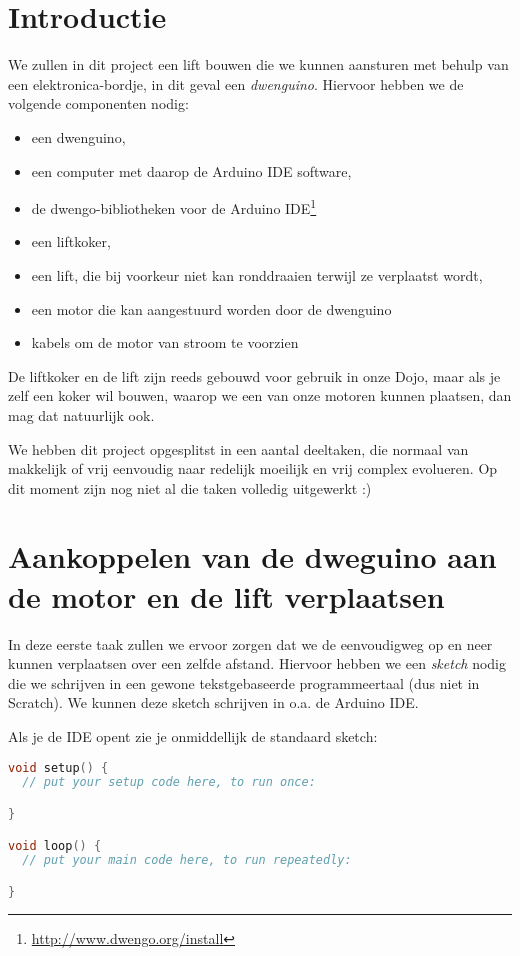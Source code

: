 \documentclass{article}
\begin{document}
\section{Introductie}

We zullen in dit project een lift bouwen die we kunnen aansturen met behulp van een elektronica-bordje, in dit
geval een {\em dwenguino}. Hiervoor hebben we de volgende componenten nodig:

\begin{itemize}
\item een dwenguino,
\item een computer met daarop de Arduino IDE software,
\item de dwengo-bibliotheken voor de Arduino IDE\footnote{\url{http://www.dwengo.org/install}}
\item een liftkoker,
\item een lift, die bij voorkeur niet kan ronddraaien terwijl ze verplaatst wordt,
\item een motor die kan aangestuurd worden door de dwenguino
\item kabels om de motor van stroom te voorzien
\end{itemize}

De liftkoker en de lift zijn reeds gebouwd voor gebruik in onze Dojo, maar als je zelf een koker wil bouwen, waarop
we een van onze motoren kunnen plaatsen, dan mag dat natuurlijk ook.

We hebben dit project opgesplitst in een aantal deeltaken, die normaal van makkelijk of vrij eenvoudig naar redelijk
moeilijk en vrij complex evolueren. Op dit moment zijn nog niet al die taken volledig uitgewerkt :)


\section{Aankoppelen van de dweguino aan de motor en de lift verplaatsen}

In deze eerste taak zullen we ervoor zorgen dat we de eenvoudigweg op en neer kunnen verplaatsen over een zelfde
afstand. Hiervoor hebben we een {\em sketch} nodig die we schrijven in een gewone tekstgebaseerde programmeertaal (dus
niet in Scratch). We kunnen deze sketch schrijven in o.a. de Arduino IDE.

Als je de IDE opent zie je onmiddellijk de standaard sketch:

\begin{lstlisting}[language=C++]
void setup() {
  // put your setup code here, to run once:

}

void loop() {
  // put your main code here, to run repeatedly:

}
\end{lstlisting}
\end{document}
